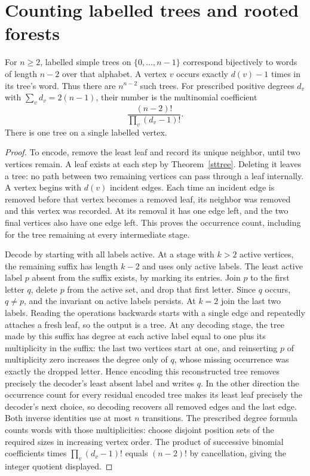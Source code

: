 \section{Counting labelled trees and rooted forests}
\label{stcounttrees}
\begin{theorem}\leavevmode\label{stprufer}
For $n\ge2$, labelled simple trees on $\{0,\ldots,n-1\}$ correspond bijectively to words of length $n-2$ over that alphabet. A vertex $v$ occurs exactly $d(v)-1$ times in its tree's word. Thus there are $n^{n-2}$ such trees. For prescribed positive degrees $d_v$ with $\sum_v d_v=2(n-1)$, their number is the multinomial coefficient
\[
  \frac{(n-2)!}{\prod_v(d_v-1)!}.
\]
There is one tree on a single labelled vertex.
\end{theorem}
\begin{proof}
To encode, remove the least leaf and record its unique neighbor, until two vertices remain. A leaf exists at each step by Theorem~\ref{sttree}. Deleting it leaves a tree: no path between two remaining vertices can pass through a leaf internally. A vertex begins with $d(v)$ incident edges. Each time an incident edge is removed before that vertex becomes a removed leaf, its neighbor was removed and this vertex was recorded. At its removal it has one edge left, and the two final vertices also have one edge left. This proves the occurrence count, including for the tree remaining at every intermediate stage.

Decode by starting with all labels active. At a stage with $k>2$ active vertices, the remaining suffix has length $k-2$ and uses only active labels. The least active label $p$ absent from the suffix exists, by marking its entries. Join $p$ to the first letter $q$, delete $p$ from the active set, and drop that first letter. Since $q$ occurs, $q\ne p$, and the invariant on active labels persists. At $k=2$ join the last two labels. Reading the operations backwards starts with a single edge and repeatedly attaches a fresh leaf, so the output is a tree. At any decoding stage, the tree made by this suffix has degree at each active label equal to one plus its multiplicity in the suffix: the last two vertices start at one, and reinserting $p$ of multiplicity zero increases the degree only of $q$, whose missing occurrence was exactly the dropped letter. Hence encoding this reconstructed tree removes precisely the decoder's least absent label and writes $q$. In the other direction the occurrence count for every residual encoded tree makes its least leaf precisely the decoder's next choice, so decoding recovers all removed edges and the last edge. Both inverse identities use at most $n$ transitions. The prescribed degree formula counts words with those multiplicities: choose disjoint position sets of the required sizes in increasing vertex order. The product of successive binomial coefficients times $\prod_v(d_v-1)!$ equals $(n-2)!$ by cancellation, giving the integer quotient displayed.
\end{proof}

